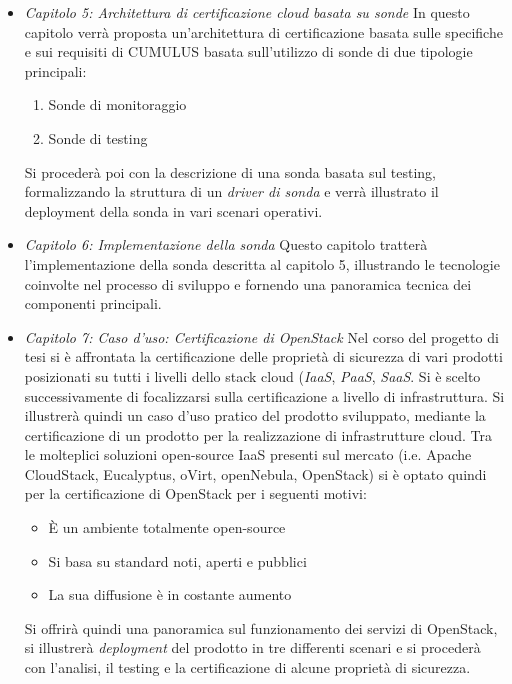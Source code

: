 \documentclass[../main.tex]{subfiles}
\begin{document}
\begin{itemize}
Nonostante i benefici economici offerti, il cloud computing pone ancora notevoli problematiche riguardanti sicurezza, privacy, autorità e conformità riguardo ai dati e ai servizi software offerti tramite di esso.
Questi problemi derivano principalmente dalla difficoltà di garantire il mantenimento delle proprietà di sicurezza in un ambiente eterogeneo. Per questo motivo, i fornitori di servizio, rifiutano di assumersi la piena responsabilità sulla sicurezza dei servizi offerti tramite questa tecnologia.
Sulla base di ciò, si cercherà quindi di definire un framework adatto alla validazione e alla certificazione di infrastrutture, piattaforme e applicativi cloud.
\item \textit{Capitolo 5: Architettura di certificazione cloud basata su sonde}\newline
In questo capitolo verrà proposta un'architettura di certificazione basata sulle specifiche e sui requisiti di CUMULUS basata sull'utilizzo di sonde di due tipologie principali:
\begin{enumerate}
\item Sonde di monitoraggio
\item Sonde di testing
\end{enumerate}
Si procederà poi con la descrizione di una sonda basata sul testing, formalizzando la struttura di un \textit{driver di sonda} e verrà illustrato il deployment della sonda in vari scenari operativi.
\item \textit{Capitolo 6: Implementazione della sonda}\newline
Questo capitolo tratterà l'implementazione della sonda descritta al capitolo 5, illustrando le tecnologie coinvolte nel processo di sviluppo e fornendo una panoramica tecnica dei componenti principali.
\item \textit{Capitolo 7: Caso d'uso: Certificazione di OpenStack}\newline
Nel corso del progetto di tesi si è affrontata la certificazione delle proprietà di sicurezza di vari prodotti posizionati su tutti i livelli dello stack cloud (\textit{IaaS}, \textit{PaaS}, \textit{SaaS}. Si è scelto successivamente di focalizzarsi sulla certificazione a livello di infrastruttura.
Si illustrerà quindi un caso d'uso pratico del prodotto sviluppato, mediante la certificazione di un prodotto per la realizzazione di infrastrutture cloud.
Tra le molteplici soluzioni open-source IaaS presenti sul mercato (i.e. Apache CloudStack,  Eucalyptus, oVirt, openNebula, OpenStack) si è optato quindi per la certificazione di OpenStack per i seguenti motivi:
\begin{itemize}
\item \`E un ambiente totalmente open-source
\item Si basa su standard noti, aperti e pubblici
\item La sua diffusione è in costante aumento
\end{itemize}
Si offrirà quindi una panoramica sul funzionamento dei servizi di OpenStack, si illustrerà \textit{deployment} del prodotto in tre differenti scenari e si procederà con l'analisi, il testing e la certificazione di alcune proprietà di sicurezza.
\end{itemize}
\end{document}
